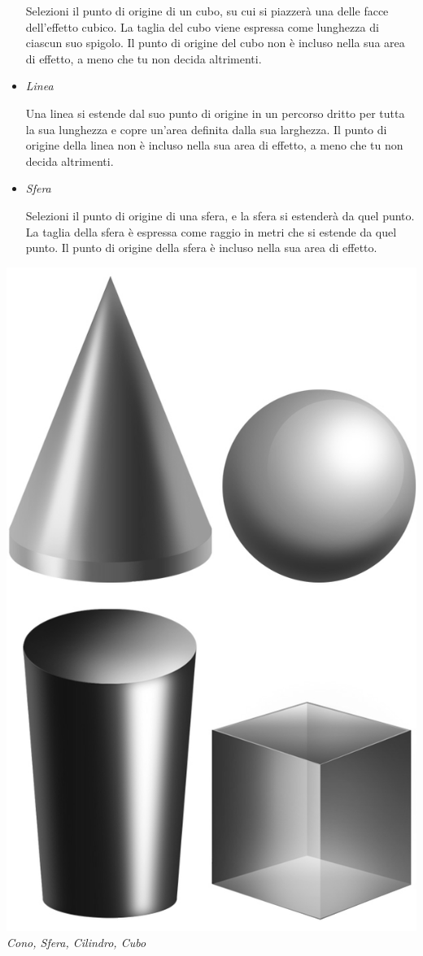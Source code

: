 \begin{multicols}{2}
\begin{itemize}
Selezioni il punto di origine di un cubo, su cui si piazzerà una delle facce dell'effetto cubico. La taglia del cubo viene espressa come lunghezza di ciascun suo spigolo. Il punto di origine del cubo non è incluso nella sua area di effetto, a meno che tu non decida altrimenti.

\item
\textit{Linea}

Una linea si estende dal suo punto di origine in un percorso dritto per tutta la sua lunghezza e copre un'area definita dalla sua larghezza. Il punto di origine della linea non è incluso nella sua area di effetto, a meno che tu non decida altrimenti.

\item
\textit{Sfera}

Selezioni il punto di origine di una sfera, e la sfera si estenderà da quel punto. La taglia della sfera è espressa come raggio in metri che si estende da quel punto.
Il punto di origine della sfera è incluso nella sua area di effetto.

\end{itemize}


\begin{center}
	\includegraphics[width=0.6\linewidth]{immagini/3dforme.png}
	\textit{Cono, Sfera, Cilindro, Cubo}
\end{center}


\end{multicols}

